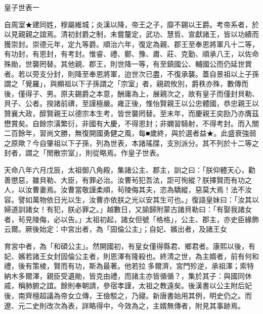 
\begin{pinyinscope}
皇子世表一

自周室★建同姓，穆屬維城；炎漢以降，帝王之子，靡不錫以王爵。考帝系者，於以見親親之誼焉。清初封爵之制，未嘗釐定，武功、慧哲、宣獻諸王，皆以功績而獲崇封。崇德元年，定九等爵。順治六年，復定為親、郡王至奉恩將軍凡十二等，有功封，有恩封，有考封。惟睿、禮、鄭、豫、肅、莊、克勤、順承八王，以佐命殊勛，世襲罔替。其他親、郡王，則世降一等，有至鎮國公、輔國公而仍延世賞者。若以旁支分封，則降至奉恩將軍，迨世次已盡，不復承襲。蓋自景祖以上子孫謂之「覺羅」，與顯祖以下子孫謂之「宗室」者，親疏攸別，爵秩亦殊，數傳而後，僅得子、男。原夫錫爵之本意，酬庸為上，展親次之，故有皇子而僅封貝勒、貝子、公者。揆諸前禩，至謹極嚴。雍正後，惟怡賢親王以公忠體國，恭忠親王以贊襄大政，醇賢親王以德宗本生考，皆世襲罔替。至末年，而慶親王奕劻乃亦膺茲懋賞矣。自餘宗潢繁衍，非國有大慶，不得恩封；非嫻習騎射，不得考封。而入關二百餘年，習尚文勝，無復開國勇健之風，每■歲終，與於選者益★。此盛衰強弱之原歟？今自肇祖以下子孫，列為世表，本諸瑤牒，支別派分。其不列於十二等之封者，謂之「閒散宗室」，則從略焉。作皇子世表。

天命八年六月戊辰，太祖御八角殿，集諸公主、郡主，訓之曰：「朕仰體天心，勸善懲惡，雖貝勒、大臣，有罪必治。汝曹茍犯吾法，詎可徇縱？朕擇賢而有功之人，以汝曹妻焉。汝曹當敬謹柔順，茍陵侮其夫，恣為驕縱，惡莫大焉！法不汝容。譬如萬物依日光以生，汝曹亦依朕之光以安其生可也。」復語皇妹曰：「汝其以婦道訓諸女！有犯，朕必罪之。」越數日，又諭歸附蒙古諸貝勒曰：「有娶我諸女者，茍見陵侮，必以告。」太祖初起，諸女但號「格格」，公主、郡主，亦史臣緣飾云爾。厥後始定：中宮出者，為「固倫公主」；自妃、嬪出者，及諸王女

育宮中者，為「和碩公主」。然開國初，有皇女僅得縣君、鄉君者。康熙以後，有妃、嬪若諸王女封固倫公主者，則恩澤有隆殺也。終清之世，為主婿者，前有何和禮，後有策棱，賢而有功，斯為最著。他若拉多爾濟，宮門殄逆，承祖澤；索特納木多爾澤，親臣受遺勛，皆克由禮，而諸主亦皆循循？，集於其子：與國同休戚，稱肺腑之誼。餘則奉朝請，參宿孝謹，太祖之教遠矣。後漢書以公主附后妃後，南齊檀超議為帝女立傳，王儉駁之，乃寢。新唐書始用其例，明史仍之。而遼、元二史則改次為表，詳略得中，今效為之，主婿無傳者，附見其事跡焉。


\end{pinyinscope}